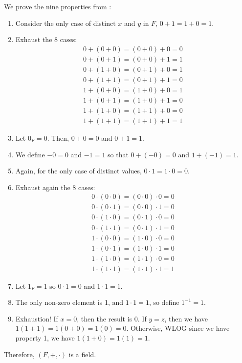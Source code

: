 \documentclass[notes]{agony}
\begin{document}
\begin{prf}
  We prove the nine properties from :
  \begin{enumerate}
    \item Consider the only case of distinct $x$ and $y$ in $F$, $0 + 1 = 1 + 0 = 1$.
    \item Exhaust the 8 cases:
          \begin{align*}
            0 + (0 + 0) = (0 + 0) + 0 = 0 \\
            0 + (0 + 1) = (0 + 0) + 1 = 1 \\
            0 + (1 + 0) = (0 + 1) + 0 = 1 \\
            0 + (1 + 1) = (0 + 1) + 1 = 0 \\
            1 + (0 + 0) = (1 + 0) + 0 = 1 \\
            1 + (0 + 1) = (1 + 0) + 1 = 0 \\
            1 + (1 + 0) = (1 + 1) + 0 = 0 \\
            1 + (1 + 1) = (1 + 1) + 1 = 1
          \end{align*}
    \item Let $0_F=0$. Then, $0 + 0 = 0$ and $0 + 1 = 1$.
    \item We define $-0 = 0$ and $-1 = 1$ so that $0 + (-0) = 0$ and $1 + (-1) = 1$.
    \item Again, for the only case of distinct values, $0 \cdot 1 = 1 \cdot 0 = 0$.
    \item Exhaust again the 8 cases:
          \begin{align*}
            0 \cdot (0 \cdot 0) = (0 \cdot 0) \cdot 0 = 0 \\
            0 \cdot (0 \cdot 1) = (0 \cdot 0) \cdot 1 = 0 \\
            0 \cdot (1 \cdot 0) = (0 \cdot 1) \cdot 0 = 0 \\
            0 \cdot (1 \cdot 1) = (0 \cdot 1) \cdot 1 = 0 \\
            1 \cdot (0 \cdot 0) = (1 \cdot 0) \cdot 0 = 0 \\
            1 \cdot (0 \cdot 1) = (1 \cdot 0) \cdot 1 = 0 \\
            1 \cdot (1 \cdot 0) = (1 \cdot 1) \cdot 0 = 0 \\
            1 \cdot (1 \cdot 1) = (1 \cdot 1) \cdot 1 = 1
          \end{align*}
    \item Let $1_F=1$ so $0 \cdot 1 = 0$ and $1 \cdot 1 = 1$.
    \item The only non-zero element is 1, and $1 \cdot 1 = 1$, so define $1^{-1} = 1$.
    \item Exhaustion! If $x=0$, then the result is 0.
          If $y = z$, then we have $1(1 + 1) = 1(0 + 0) = 1(0) = 0$.
          Otherwise, WLOG since we have property 1, we have $1(1 + 0) = 1(1) = 1$.
  \end{enumerate}
  Therefore, $(F,+,\cdot)$ is a field.
\end{prf}
\end{document}
